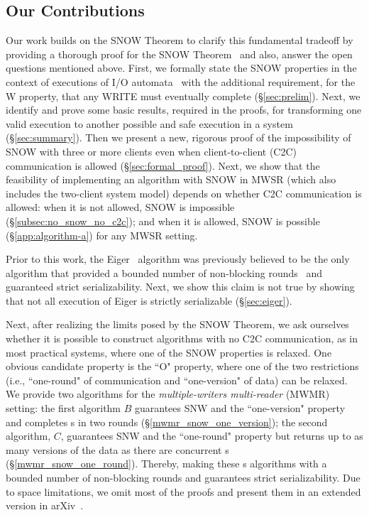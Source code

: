 \subsection{Our Contributions}
{\color{blue}
Our work builds on the SNOW Theorem to clarify this fundamental tradeoff by providing a thorough proof for the SNOW Theorem~\cite{SNOW2016} and also, answer the open questions mentioned above. 
First, we formally state the SNOW properties in the context of executions of I/O automata~\cite{Lynch1996}  with the additional requirement, for the W property, that any WRITE must eventually complete (\S\ref{sec:prelim}). Next, we identify and prove some basic results, required in the proofs, for transforming one valid execution to another possible and safe execution in a \rot{} system (\S\ref{sec:summary}). 
Then we present a new, rigorous proof of the impossibility of SNOW with three or more clients even when client-to-client (C2C) communication is allowed (\S\ref{sec:formal_proof}).
Next, we show that the feasibility of implementing an algorithm with SNOW in MWSR (which also includes the two-client system model) depends on whether C2C communication is allowed:
when it is not allowed, SNOW is impossible (\S\ref{subsec:no_snow_no_c2c}); and when it is allowed, SNOW is possible (\S\ref{app:algorithm-a}) for any MWSR setting.

Prior to this work, the Eiger~\cite{Lloyd:nsdi2013} algorithm was previously believed to be the only algorithm that provided a bounded number of non-blocking rounds~\cite{Lloyd:nsdi2013} and guaranteed strict serializability. 
Next, we show this claim is not true by showing that not all execution of Eiger is strictly serializable (\S\ref{sec:eiger}).

Next, after realizing the limits posed by the SNOW Theorem, we ask ourselves whether it is possible to construct \rot{} algorithms with no C2C communication, as in most practical systems, where one of the SNOW properties is relaxed. One obvious candidate property is the ``O" property, where one of the two restrictions (i.e., ``one-round" of communication and ``one-version" of data) can be relaxed. We provide two algorithms for the \emph{multiple-writers multi-reader} (MWMR) setting: the first algorithm $B$ guarantees SNW and the ``one-version" property and completes \rot{}s in two rounds (\S\ref{mwmr_snow_one_version}); the second algorithm, $C$, guarantees SNW and the ``one-round" property but returns up to as many versions of the data as there are concurrent \wot{}s
(\S\ref{mwmr_snow_one_round}). Thereby, making these \rot{}s algorithms with a bounded number of non-blocking rounds and guarantees strict serializability. 
%
Due to space limitations, we omit most of the proofs and present them in an extended version in arXiv~\cite{konwar2018snow}.
}

